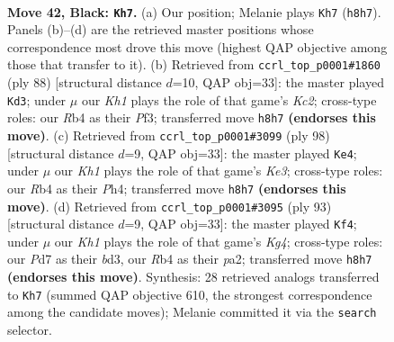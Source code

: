 \documentclass[11pt]{article}
\begin{document}
\clearpage

\begin{figure}[p]\centering
\begin{subfigure}{0.46\textwidth}\centering
\resizebox{\linewidth}{!}{%
\newchessgame
\chessboard[
  setfen={7k/p2p4/2p2p2/5K2/1r1P4/8/5P1P/8 b - - 1 42},
  showmover=false,
  pgfstyle=straightmove, color=movearrow, markmove={h8-h7}
]}
\caption{}
\end{subfigure}\hfill
\begin{subfigure}{0.46\textwidth}\centering
\resizebox{\linewidth}{!}{%
\newchessgame
\chessboard[
  setfen={8/8/Pk6/1P6/5p1p/4pP1P/2K5/8 w - - 3 45},
  showmover=false,
  pgfstyle=straightmove, color=movearrow, markmove={c2-d3}
]}
\caption{}
\end{subfigure}
\\[4pt]
\begin{subfigure}{0.46\textwidth}\centering
\resizebox{\linewidth}{!}{%
\newchessgame
\chessboard[
  setfen={8/8/4kP2/p3P2p/6pP/4K3/P7/8 w - - 2 50},
  showmover=false,
  pgfstyle=straightmove, color=movearrow, markmove={e3-e4}
]}
\caption{}
\end{subfigure}\hfill
\begin{subfigure}{0.46\textwidth}\centering
\resizebox{\linewidth}{!}{%
\newchessgame
\chessboard[
  setfen={8/8/3p4/p2P2k1/8/3B2p1/P5Kp/8 b - - 1 47},
  showmover=false,
  pgfstyle=straightmove, color=movearrow, markmove={g5-f4}
]}
\caption{}
\end{subfigure}
\caption{\textbf{Move 42, Black: \texttt{Kh7}.} (a) Our position; Melanie plays \texttt{Kh7} (\texttt{h8h7}). Panels (b)--(d) are the retrieved master positions whose correspondence most drove this move (highest QAP objective among those that transfer to it). (b) Retrieved from \texttt{ccrl\_top\_p0001\#1860} (ply 88) [structural distance $d$=10, QAP obj=33]: the master played \texttt{Kd3}; under $\mu$ our \emph{Kh1} plays the role of that game's \emph{Kc2}; cross-type roles: our \emph{R}b4 as their \emph{P}f3; transferred move \texttt{h8h7} \textbf{(endorses this move)}. (c) Retrieved from \texttt{ccrl\_top\_p0001\#3099} (ply 98) [structural distance $d$=9, QAP obj=33]: the master played \texttt{Ke4}; under $\mu$ our \emph{Kh1} plays the role of that game's \emph{Ke3}; cross-type roles: our \emph{R}b4 as their \emph{P}h4; transferred move \texttt{h8h7} \textbf{(endorses this move)}. (d) Retrieved from \texttt{ccrl\_top\_p0001\#3095} (ply 93) [structural distance $d$=9, QAP obj=33]: the master played \texttt{Kf4}; under $\mu$ our \emph{Kh1} plays the role of that game's \emph{Kg4}; cross-type roles: our \emph{P}d7 as their \emph{b}d3, our \emph{R}b4 as their \emph{p}a2; transferred move \texttt{h8h7} \textbf{(endorses this move)}. Synthesis: 28 retrieved analogs transferred to \texttt{Kh7} (summed QAP objective 610, the strongest correspondence among the candidate moves); Melanie committed it via the \texttt{search} selector.}
\label{fig:thought-m83}
\end{figure}
\end{document}
